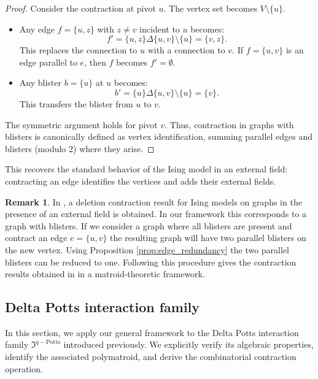 \documentclass[11pt,reqno]{amsart}
\newcommand{\mcp}{\mathfrak{I}^{q-\mathrm{Potts}}}
\theoremstyle{plain}
\theoremstyle{definition}
\newtheorem{remark}[theorem]{Remark}
\numberwithin{equation}{section}
\begin{document}
\begin{proof}
    Consider the contraction at pivot $u$. The vertex set becomes $V \setminus \{u\}$.
    \begin{itemize}
        \item Any edge $f=\{u, z\}$ with $z\neq v$ incident to $u$ becomes:
        \[ f' = \{u, z\} \Delta \{u, v\} \setminus \{u\} = \{v, z\}. \]
        This replaces the connection to $u$ with a connection to $v$. If $f = \{u,v\}$ is an edge parallel to $e$, then $f$ becomes $f'=\emptyset$.
        \item Any blister $b=\{u\}$ at $u$ becomes:
        \[ b' = \{u\} \Delta \{u, v\} \setminus \{u\} = \{v\}. \]
        This transfers the blister from $u$ to $v$.
    \end{itemize}
    The symmetric argument holds for pivot $v$. Thus, contraction in graphs with blisters is canonically defined as vertex identification, summing parallel edges and blisters (modulo 2) where they arise.
\end{proof}

This recovers the standard behavior of the Ising model in an external field: contracting an edge identifies the vertices and adds their external fields.

\begin{remark}
   In \cite{zbMATH05956368}, a deletion contraction result for Ising models on graphs in the presence of an external field is obtained. In our framework this corresponds to a graph with blisters. If we consider a graph where all blisters are present and contract an edge $e = \{u,v\}$ the resulting graph will have two parallel blisters on the new vertex. Using Proposition \ref{prop:edge_redundancy} the two parallel blisters can be reduced to one. Following this procedure gives the contraction results obtained in \cite{zbMATH05956368} in a matroid-theoretic framework.
\end{remark}

\subsection{Delta Potts interaction family}
\label{sec:potts}

In this section, we apply our general framework to the Delta Potts interaction family $\mcp$ introduced previously. We explicitly verify its algebraic properties, identify the associated polymatroid, and derive the combinatorial contraction operation.
\end{document}
